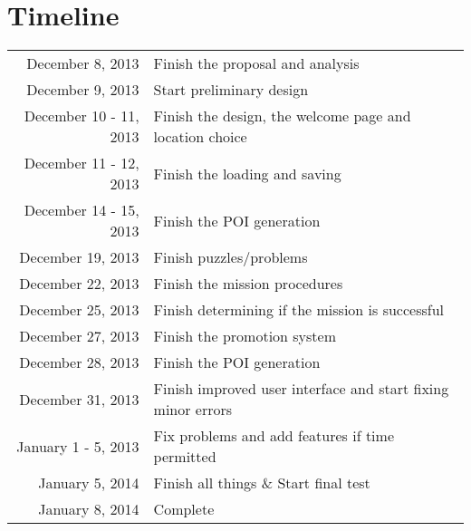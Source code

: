 \documentclass[letterpaper,12pt]{article}
\newcommand{\dotS}{\hspace{-3pt}$\bullet$ \hspace{2.5pt}}
\begin{document}
\section{Timeline}
        \begin{tabular}{r | @{\dotS} l}
		        December 8, 2013		&	Finish the proposal and analysis					        	\\
                December 9, 2013		&	Start preliminary design								        \\
                December 10 - 11, 2013	&	Finish the design, the welcome page and location choice	        \\
         	December 11 - 12, 2013	&	Finish the loading and saving						        	\\
                December 14 - 15, 2013	&	Finish the POI generation							        	\\
                December 19, 2013		&	Finish puzzles/problems							            	\\
                December 22, 2013		&	Finish the mission procedures						        	\\
                December 25, 2013		&	Finish determining if the mission is successful		        	\\
                December 27, 2013		&	Finish the promotion system						            	\\
                December 28, 2013		&	Finish the POI generation							        	\\
                December 31, 2013		&	Finish improved user interface and start fixing minor errors	\\
		January 1 - 5, 2013		&	Fix problems and add features if time permitted		            \\
		        January 5, 2014			&	Finish all things \& Start final test					       	\\
		        January 8, 2014			&	Complete
        \end{tabular}
\end{document}
